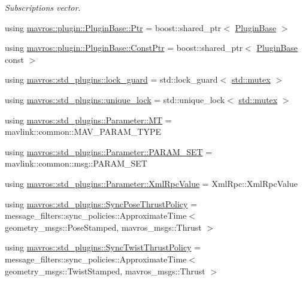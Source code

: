 \begin{DoxyCompactItemize}
\begin{DoxyCompactList}\small\item\em Subscriptions vector. \end{DoxyCompactList}\item 
using \mbox{\hyperlink{group__plugin_ga61d4cf3cc97503da0157ead2ac68dc47}{mavros\+::plugin\+::\+Plugin\+Base\+::\+Ptr}} = boost\+::shared\+\_\+ptr$<$ \mbox{\hyperlink{classmavros_1_1plugin_1_1PluginBase}{Plugin\+Base}} $>$
\item 
using \mbox{\hyperlink{group__plugin_gaba13f33fe0f830b90b51bbe2d168f683}{mavros\+::plugin\+::\+Plugin\+Base\+::\+Const\+Ptr}} = boost\+::shared\+\_\+ptr$<$ \mbox{\hyperlink{classmavros_1_1plugin_1_1PluginBase}{Plugin\+Base}} const  $>$
\item 
using \mbox{\hyperlink{group__plugin_gaf7a417aa5096c3eb3c0856187e77b766}{mavros\+::std\+\_\+plugins\+::lock\+\_\+guard}} = std\+::lock\+\_\+guard$<$ \mbox{\hyperlink{data_8c_a4acff8232e4aec9cd5c6dc200ac55ef3}{std\+::mutex}} $>$
\item 
using \mbox{\hyperlink{group__plugin_ga9de76c8b4514d14b9b92bdbc83572808}{mavros\+::std\+\_\+plugins\+::unique\+\_\+lock}} = std\+::unique\+\_\+lock$<$ \mbox{\hyperlink{data_8c_a4acff8232e4aec9cd5c6dc200ac55ef3}{std\+::mutex}} $>$
\item 
using \mbox{\hyperlink{group__plugin_ga7d57778649dff1fd8c9aaf2599ff5238}{mavros\+::std\+\_\+plugins\+::\+Parameter\+::\+MT}} = mavlink\+::common\+::\+M\+A\+V\+\_\+\+P\+A\+R\+A\+M\+\_\+\+T\+Y\+PE
\item 
using \mbox{\hyperlink{group__plugin_gaa94f933e0249802ee1985cb650408c31}{mavros\+::std\+\_\+plugins\+::\+Parameter\+::\+P\+A\+R\+A\+M\+\_\+\+S\+ET}} = mavlink\+::common\+::msg\+::\+P\+A\+R\+A\+M\+\_\+\+S\+ET
\item 
using \mbox{\hyperlink{group__plugin_gafe570e1ad21e55964c02084e1a485c92}{mavros\+::std\+\_\+plugins\+::\+Parameter\+::\+Xml\+Rpc\+Value}} = Xml\+Rpc\+::\+Xml\+Rpc\+Value
\item 
using \mbox{\hyperlink{group__plugin_ga48ed4062810bb42590cbed0b4e0dc237}{mavros\+::std\+\_\+plugins\+::\+Sync\+Pose\+Thrust\+Policy}} = message\+\_\+filters\+::sync\+\_\+policies\+::\+Approximate\+Time$<$ geometry\+\_\+msgs\+::\+Pose\+Stamped, mavros\+\_\+msgs\+::\+Thrust $>$
\item 
using \mbox{\hyperlink{group__plugin_gacfaec844da30bf9462d4583c55fa64e1}{mavros\+::std\+\_\+plugins\+::\+Sync\+Twist\+Thrust\+Policy}} = message\+\_\+filters\+::sync\+\_\+policies\+::\+Approximate\+Time$<$ geometry\+\_\+msgs\+::\+Twist\+Stamped, mavros\+\_\+msgs\+::\+Thrust $>$

\end{DoxyCompactItemize}
